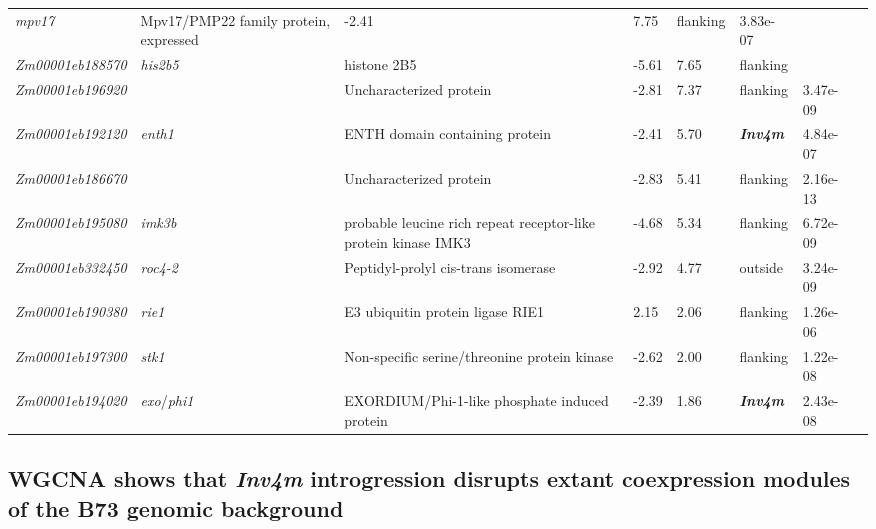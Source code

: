 \documentclass[9pt,twocolumn,twoside]{rilabRxiv}
\newcommand{\invfour}{\textit{Inv4m}\xspace}
\begin{document}
\begin{table}[!ht]
{\begin{tabular}{llllllll}
  \textit{mpv17} &
  Mpv17/PMP22 family protein, expressed &
  -2.41 &
  7.75 &
  flanking &
  3.83e-07 &
  \cite{liu2023, peiffer2014} \\
  \textit{Zm00001eb188570} &
  \textit{his2b5} &
  histone 2B5 &
  -5.61 &
  7.65 &
  flanking &
   &
  \cite{liu2023} \\
  \textit{Zm00001eb196920} &
   &
  Uncharacterized protein &
  -2.81 &
  7.37 &
  flanking &
  3.47e-09 &
  \cite{liu2023, peiffer2014} \\
  \textit{Zm00001eb192120} &
  \textit{enth1} &
  ENTH domain containing protein &
  -2.41 &
  5.70 &
  \textbf{\invfour} &
  4.84e-07 &
  \cite{liu2023, peiffer2014} \\
  \textit{Zm00001eb186670} &
   &
  Uncharacterized protein &
  -2.83 &
  5.41 &
  flanking &
  2.16e-13 &
  \cite{liu2023, peiffer2014} \\
  \textit{Zm00001eb195080} &
  \textit{imk3b} &
  probable leucine rich repeat receptor-like protein kinase IMK3 &
  -4.68 &
  5.34 &
  flanking &
  6.72e-09 &
  \cite{liu2023, peiffer2014} \\
  \textit{Zm00001eb332450} &
  \textit{roc4-2} &
  Peptidyl-prolyl cis-trans isomerase &
  -2.92 &
  4.77 &
  outside &
  3.24e-09 &
  \cite{liu2023, peiffer2014} \\
  \textit{Zm00001eb190380} &
  \textit{rie1} &
  E3 ubiquitin protein ligase RIE1 &
  2.15 &
  2.06 &
  flanking &
  1.26e-06 &
  \cite{liu2023} \\
  \textit{Zm00001eb197300} &
  \textit{stk1} &
  Non-specific serine/threonine protein kinase &
  -2.62 &
  2.00 &
  flanking &
  1.22e-08 &
  \cite{liu2023, peiffer2014} \\
  \textit{Zm00001eb194020} &
  \textit{exo}/\textit{phi1} &
  EXORDIUM/Phi-1-like phosphate induced protein &
  -2.39 &
  1.86 &
  \textbf{\invfour} &
  2.43e-08 &
  \cite{liu2023, peiffer2014} \\
 \bottomrule
\end{tabular}%
}
\end{table}


\subsection{WGCNA shows that \invfour introgression disrupts extant coexpression modules of the B73 genomic background}
\end{document}
